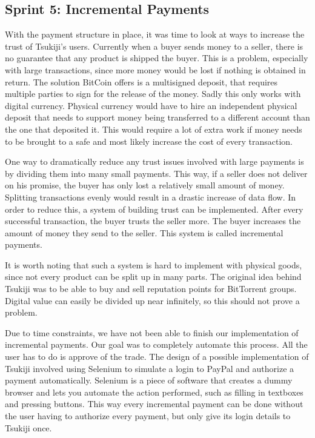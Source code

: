 \subsection{Sprint 5: Incremental Payments}
\label{incpay}
With the payment structure in place, it was time to look at ways to increase the trust of Tsukiji's users.
Currently when a buyer sends money to a seller, there is no guarantee that any product is shipped the buyer.
This is a problem, especially with large transactions, since more money would be lost if nothing is obtained in return.
The solution BitCoin offers is a multisigned deposit, that requires multiple parties to sign for the release of the money.
Sadly this only works with digital currency.
Physical currency would have to hire an independent physical deposit that needs to support money being transferred to a different account than the one that deposited it.
This would require a lot of extra work if money needs to be brought to a safe and most likely increase the cost of every transaction.

One way to dramatically reduce any trust issues involved with large payments is by dividing them into many small payments.
This way, if a seller does not deliver on his promise, the buyer has only lost a relatively small amount of money.
Splitting transactions evenly would result in a drastic increase of data flow. 
In order to reduce this, a system of building trust can be implemented.
After every successful transaction, the buyer trusts the seller more.
The buyer increases the amount of money they send to the seller.
This system is called incremental payments.

It is worth noting that such a system is hard to implement with physical goods, since not every product can be split up in many parts.
The original idea behind Tsukiji was to be able to buy and sell reputation points for BitTorrent groups.
Digital value can easily be divided up near infinitely, so this should not prove a problem.

Due to time constraints, we have not been able to finish our implementation of incremental payments.
Our goal was to completely automate this process.
All the user has to do is approve of the trade.
The design of a possible implementation of Tsukiji involved using Selenium to simulate a login to PayPal and authorize a payment automatically.
Selenium \cite{selenium} is a piece of software that creates a dummy browser and lets you automate the action performed, such as filling in textboxes and pressing buttons.
This way every incremental payment can be done without the user having to authorize every payment, but only give its login details to Tsukiji once.

